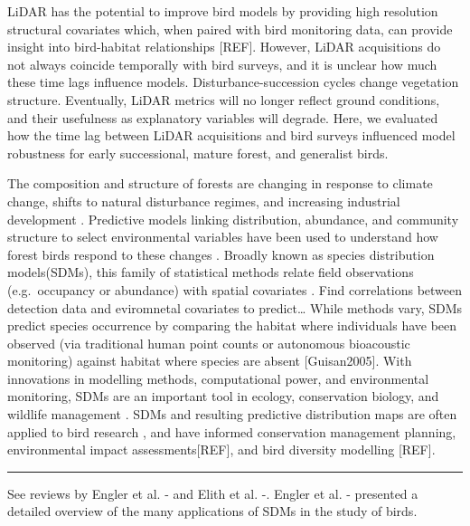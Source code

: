 \documentclass[remotesensing, aricle,submit,moreauthors]{Definitions/mdpi}
\begin{document}
LiDAR has the potential to improve bird models by providing high resolution structural covariates which, when paired with bird monitoring data, can provide insight into bird-habitat relationships {[}REF{]}. However, LiDAR acquisitions do not always coincide temporally with bird surveys, and it is unclear how much these time lags influence models. Disturbance-succession cycles change vegetation structure. Eventually, LiDAR metrics will no longer reflect ground conditions, and their usefulness as explanatory variables will degrade. Here, we evaluated how the time lag between LiDAR acquisitions and bird surveys influenced model robustness for early successional, mature forest, and generalist birds.

The composition and structure of forests are changing in response to climate change, shifts to natural disturbance regimes, and increasing industrial development \citep{Brandt2013}. Predictive models linking distribution, abundance, and community structure to select environmental variables have been used to understand how forest birds respond to these changes \citep{Carrillo-Rubio2014, Engler2017a, guisanPredictiveHabitatDistribution2000, He2015}. Broadly known as species distribution models(SDMs), this family of statistical methods relate field observations (e.g.~occupancy or abundance) with spatial covariates \citep{Guisan2005}. Find correlations between detection data and eviromnetal covariates to predict\ldots{} While methods vary, SDMs predict species occurrence by comparing the habitat where individuals have been observed (via traditional human point counts or autonomous bioacoustic monitoring) against habitat where species are absent {[}Guisan2005{]}. With innovations in modelling methods, computational power, and environmental monitoring, SDMs are an important tool in ecology, conservation biology, and wildlife management \citep{Elith2009}. SDMs and resulting predictive distribution maps are often applied to bird research \citet{englerAvianSDMsCurrent2017}, and have informed conservation management planning, environmental impact assessments{[}REF{]}, and bird diversity modelling {[}REF{]}\citep{englerAvianSDMsCurrent2017, franklinMappingSpeciesDistributions2010}.

\begin{center}\rule{0.5\linewidth}{0.5pt}\end{center}

See reviews by Engler et al. -\citet{englerAvianSDMsCurrent2017} and Elith et al. -\citet{Elith2009}. Engler et al. -\citet{englerAvianSDMsCurrent2017} presented a detailed overview of the many applications of SDMs in the study of birds.
\end{document}
